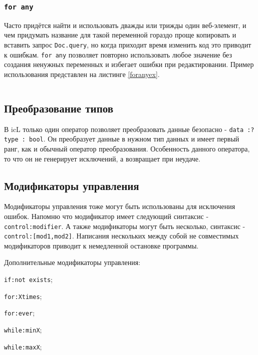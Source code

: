 \begin{sourcecode}
	\label{ifexistsex}
    \inputminted[linenos]{icl}{../sources/ifexistsex.icL}
\end{sourcecode}

\subsubsection{\texttt{for any}}

Часто придётся найти и использовать дважды или трижды один веб-элемент, и чем придумать название для такой переменной гораздо проще копировать и вставить запрос \texttt{Doc.query}, но когда приходит время изменить код это приводит к ошибкам. \texttt{for any} позволяет повторно использовать любое значение без создания ненужных переменных и избегает ошибки при редактировании. Пример использования представлен на листинге \ref{foranyex}.

\begin{sourcecode}
	\label{foranyex}
    \inputminted[linenos]{icl}{../sources/foranyex.icL}
\end{sourcecode}

\subsection{Преобразование типов}

В icL только один оператор позволяет преобразовать данные безопасно - \texttt{data :? type : bool}.
Он преобразует данные в нужном тип данных и имеет первый ранг, как и обычный оператор преобразования. Особенность данного оператора, то что он не генерирует исключений, а возвращает \void{} при неудаче.

\subsection{Модификаторы управления}

Модификаторы управления тоже могут быть использованы для исключения ошибок. Напомню что модификатор имеет следующий синтаксис - \texttt{control:modifier}. А также модификаторы могут быть несколько, синтаксис - \texttt{control:[mod1,mod2]}. Написания нескольких между собой не совместимых модификаторов приводит к немедленной остановке программы.

Дополнительные модификаторы управления:
\begin{icItems}
	\item \texttt{if:not exists};
	\item \texttt{for:Xtimes};
	\item \texttt{for:ever};
	\item \texttt{while:minX};
	\item \texttt{while:maxX};
\end{icItems}


